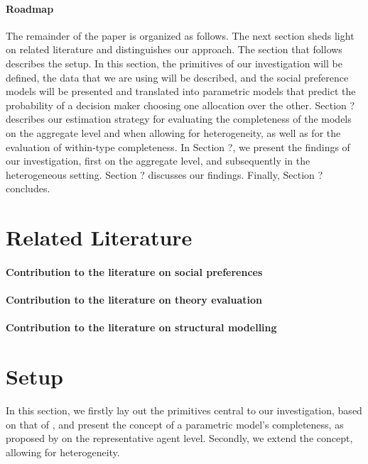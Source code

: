 \documentclass[letterpaper,11pt,leqno]{article}
\begin{document}
\paragraph{Roadmap} The remainder of the paper is organized as follows. The next section sheds light on related literature and distinguishes our approach. The section that follows describes the setup. In this section, the primitives of our investigation will be defined, the data that we are using will be described, and the social preference models will be presented and translated into parametric models that predict the probability of a decision maker choosing one allocation over the other. Section ? describes our estimation strategy for evaluating the completeness of the models on the aggregate level and when allowing for heterogeneity, as well as for the evaluation of within-type completeness. In Section ?, we present the findings of our investigation, first on the aggregate level, and subsequently in the heterogeneous setting. Section ? discusses our findings. Finally, Section ? concludes. 

\section{Related Literature}

\paragraph{Contribution to the literature on social preferences}

\paragraph{Contribution to the literature on theory evaluation}

\paragraph{Contribution to the literature on structural modelling}

\section{Setup}
In this section, we firstly lay out the primitives central to our investigation, based on that of \citet{Fudenberg2021a}, and present the concept of a parametric model's completeness, as proposed by \citet{Fudenberg2022} on the representative agent level. Secondly, we extend the concept, allowing for heterogeneity.
\end{document}
